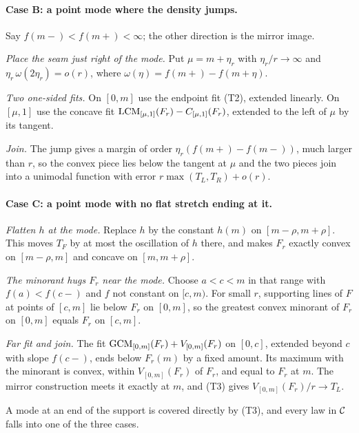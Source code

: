 \paragraph{Case B: a point mode where the density jumps.} Say $f(m-)<f(m+)<\infty$; the other direction is the mirror image.
\begin{steps}
\item \emph{Place the seam just right of the mode.} Put $\mu=m+\eta_r$ with $\eta_r/r\to\infty$ and $\eta_r\,\omega(2\eta_r)=o(r)$, where $\omega(\eta)=f(m+)-f(m+\eta)$.
\item \emph{Two one-sided fits.} On $[0,m]$ use the endpoint fit (T2), extended linearly. On $[\mu,1]$ use the concave fit $\operatorname{LCM}_{[\mu,1]}(F_r)-C_{[\mu,1]}(F_r)$, extended to the left of $\mu$ by its tangent.
\item \emph{Join.} The jump gives a margin of order $\eta_r(f(m+)-f(m-))$, much larger than $r$, so the convex piece lies below the tangent at $\mu$ and the two pieces join into a unimodal function with error $r\max(T_L,T_R)+o(r)$.
\end{steps}

\paragraph{Case C: a point mode with no flat stretch ending at it.}
\begin{steps}
\item \emph{Flatten $h$ at the mode.} Replace $h$ by the constant $h(m)$ on $[m-\rho,m+\rho]$. This moves $T_F$ by at most the oscillation of $h$ there, and makes $F_r$ exactly convex on $[m-\rho,m]$ and concave on $[m,m+\rho]$.
\item \emph{The minorant hugs $F_r$ near the mode.} Choose $a<c<m$ in that range with $f(a)<f(c-)$ and $f$ not constant on $[c,m)$. For small $r$, supporting lines of $F$ at points of $[c,m]$ lie below $F_r$ on $[0,m]$, so the greatest convex minorant of $F_r$ on $[0,m]$ equals $F_r$ on $[c,m]$.
\item \emph{Far fit and join.} The fit $\operatorname{GCM}_{[0,m]}(F_r)+V_{[0,m]}(F_r)$ on $[0,c]$, extended beyond $c$ with slope $f(c-)$, ends below $F_r(m)$ by a fixed amount. Its maximum with the minorant is convex, within $V_{[0,m]}(F_r)$ of $F_r$, and equal to $F_r$ at $m$. The mirror construction meets it exactly at $m$, and (T3) gives $V_{[0,m]}(F_r)/r\to T_L$.
\end{steps}
A mode at an end of the support is covered directly by (T3), and every law in $\mathcal{C}$ falls into one of the three cases.

